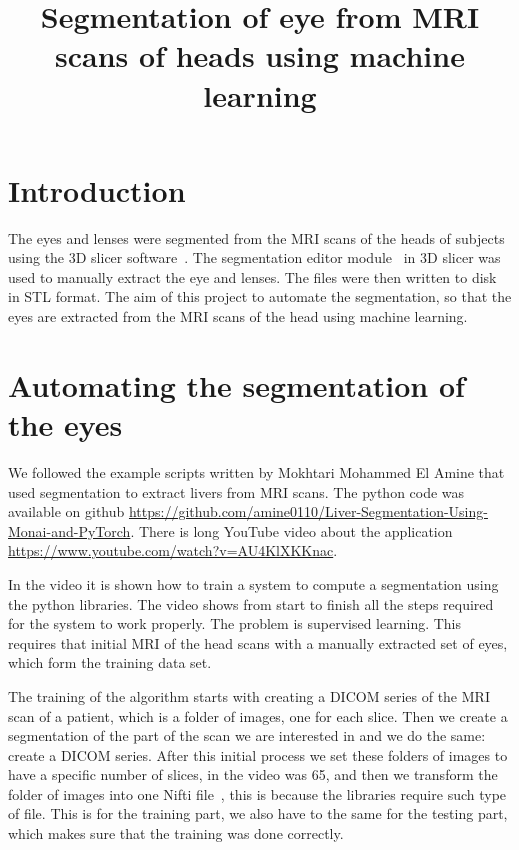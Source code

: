 \documentclass[12pt]{article}
\begin{document}
\title{Segmentation of eye from MRI scans of heads using machine learning}
\date{}

\maketitle


\section{Introduction}

The eyes and lenses were segmented from the MRI scans of the heads
of subjects using the 3D slicer software~\cite{kikinis20133d}.  The
segmentation editor module~\cite{pinter2019polymorph} in 3D slicer was
used to manually extract the eye and lenses.  The files were then
written to disk in STL format. The aim of this project to automate the
segmentation, so that the eyes are extracted from the MRI scans
of the head using machine learning.

\section{Automating the segmentation of the eyes}

We followed the example scripts written by
Mokhtari Mohammed El Amine that used segmentation to extract
livers from MRI scans. The python code was available
on github
\url{https://github.com/amine0110/Liver-Segmentation-Using-Monai-and-PyTorch}. There
is long YouTube video about the application
\url{https://www.youtube.com/watch?v=AU4KlXKKnac}.


In the video it is shown how to train a system to compute a
segmentation using the python libraries. The video shows
from start to finish all the steps required for the system to work
properly. The problem is supervised learning. This requires that
initial MRI of the head scans with  a manually extracted set of eyes,
which form the training data set.


The training of the algorithm starts with creating a DICOM series of
the MRI scan of a patient, which is a folder of images, one for each
slice. Then we create a segmentation of the part of the scan we are
interested in and we do the same: create a DICOM series. After this
initial process we set these folders of images to have a specific
number of slices, in the video was 65, and then we transform the
folder of images into one Nifti file~\cite{li2016first},
this is because the libraries
require such type of file. This is for the training part, we also have
to the same for the testing part, which makes sure that the training
was done correctly.
\end{document}
